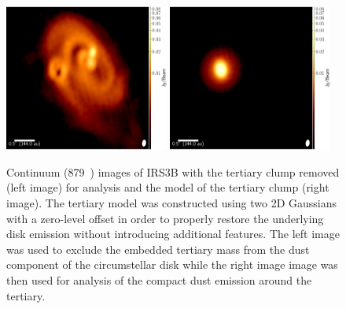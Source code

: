 \begin{figure}[H]
  \begin{center}
   \includegraphics[width=0.48\textwidth]{img/L1448IRS3B-cont-subclump-robust05binary_uc.pdf} %
   \includegraphics[width=0.48\textwidth]{img/tertiary-onlycont_uc.pdf} %
   \end{center}
   \caption{Continuum (879~\micron) images of IRS3B with the tertiary clump removed (left image) for analysis and the model of the tertiary clump (right image). The tertiary model was constructed using two 2D Gaussians with a zero-level offset in order to properly restore the underlying disk emission without introducing additional features. The left image was used to exclude the embedded tertiary mass from the dust component of the circumstellar disk while the right image image was then used for analysis of the compact dust emission around the tertiary.} \label{fig:subclump}
\end{figure}

